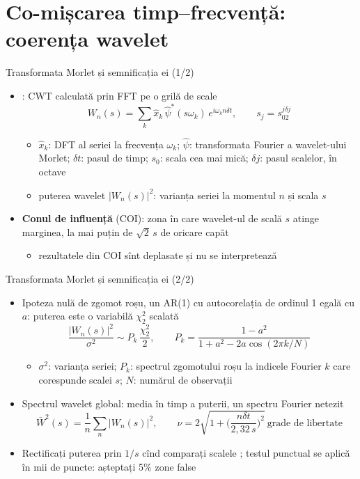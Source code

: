 \section{Co-mișcarea timp--frecvență: coerența wavelet}

\begin{frame}{Transformata Morlet și semnificația ei (1/2)}
\itemsize{\small}
\begin{itemize}
    \item {}: CWT calculată prin FFT pe o grilă de scale
    \[ W_n(s) = \sum_k\hat x_k\,\hat\psi^*(s\omega_k)\,e^{i\omega_kn\delta t}, \qquad s_j = s_02^{j\delta j} \]
    \begin{itemize}
        \item $\hat x_k$: DFT al seriei la frecvența $\omega_k$; $\hat\psi$: transformata Fourier a wavelet-ului Morlet; $\delta t$: pasul de timp; $s_0$: scala cea mai mică; $\delta j$: pasul scalelor, în octave
        \item puterea wavelet $|W_n(s)|^2$: varianța seriei la momentul $n$ și scala $s$
    \end{itemize}
    \item \textbf{Conul de influență} (COI): zona în care wavelet-ul de scală $s$ atinge marginea, la mai puțin de $\sqrt2\,s$ de oricare capăt
    \begin{itemize}
        \item rezultatele din COI sînt deplasate și nu se interpretează
    \end{itemize}
\end{itemize}
\end{frame}

\begin{frame}{Transformata Morlet și semnificația ei (2/2)}
\itemsize{\small}
\begin{itemize}
    \item Ipoteza nulă de zgomot roșu, un AR(1) cu autocorelația de ordinul 1 egală cu $a$: puterea este o variabilă $\chi^2_2$ scalată
    \[ \frac{|W_n(s)|^2}{\sigma^2} \sim P_k\,\frac{\chi^2_2}{2}, \qquad P_k = \frac{1 - a^2}{1 + a^2 - 2a\cos(2\pi k/N)} \]
    \begin{itemize}
        \item $\sigma^2$: varianța seriei; $P_k$: spectrul zgomotului roșu la indicele Fourier $k$ care corespunde scalei $s$; $N$: numărul de observații
    \end{itemize}
    \item Spectrul wavelet global: media în timp a puterii, un spectru Fourier netezit
    \[ \bar W^2(s) = \frac1n\sum_n|W_n(s)|^2, \qquad \nu = 2\sqrt{1 + \Big(\frac{n\delta t}{2{,}32\,s}\Big)^2} \ \text{grade de libertate} \]
    \item Rectificați puterea prin $1/s$ cînd comparați scalele ; testul punctual se aplică în mii de puncte: așteptați 5\% zone false 
\end{itemize}
\end{frame}

